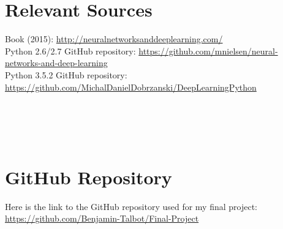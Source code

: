 \documentclass{article}
\begin{document}
\section{Relevant Sources}

Book (2015):
    \url{http://neuralnetworksanddeeplearning.com/}\\
Python 2.6/2.7 GitHub repository:
    \url{https://github.com/mnielsen/neural-networks-and-deep-learning} \\
Python 3.5.2 GitHub repository:
    \url{https://github.com/MichalDanielDobrzanski/DeepLearningPython} \\
\cite{albawi2017understanding}\\
\cite{liu2020comparisions}\\
\cite{o2015introduction}\\
\cite{pashine2021handwritten}\\
\cite{wu2017introduction}
\cite{ahlawat2020improved}


\section{GitHub Repository}
Here is the link to the GitHub repository used for my final project:
\quad \url{https://github.com/Benjamin-Talbot/Final-Project}

\newpage


\end{document}

